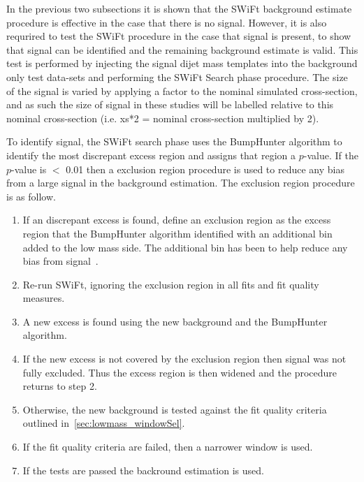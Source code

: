 In the previous two subsections it is shown that the SWiFt background estimate procedure is effective in the case that there is no signal.
However, it is also requrired to test the SWiFt procedure in the case that signal is present, to show that signal can be identified and the remaining background estimate is valid.
This test is performed by injecting the signal dijet mass templates into the background only test data-sets and performing the SWiFt Search phase procedure.
The size of the signal is varied by applying a factor to the nominal simulated cross-section,
and as such the size of signal in these studies will be labelled relative to this nominal cross-section (i.e. xs*2 = nominal cross-section multiplied by 2).

To identify signal,
the SWiFt search phase uses the {\sc BumpHunter} algorithm to identify the most discrepant excess region and assigns that region a \mbox{$p$-value}.
If the \mbox{$p$-value} is $<$ 0.01 then a exclusion region procedure is used to reduce any bias from a large signal in the background estimation.
The exclusion region procedure is as follow.
\begin{enumerate}[leftmargin=*]
\item If an discrepant excess is found, define an exclusion region as the excess
  region that the {\sc BumpHunter} algorithm identified with an additional bin added to the low mass side.
  The additional bin has been to help reduce any bias from signal~\cite{dijet-mori16_paper}.
\item Re-run SWiFt, ignoring the exclusion region in all fits and fit quality measures.
\item A new excess is found using the new background and the {\sc BumpHunter} algorithm.
\item If the new excess is not covered by the exclusion region then signal was not fully excluded.
  Thus the excess region is then widened and the procedure returns to step 2.
\item Otherwise, the new background is tested against the fit quality criteria outlined in~\ref{sec:lowmass_windowSel}.
\item If the fit quality criteria are failed, then a narrower window is used.
\item If the tests are passed the backround estimation is used.
\end{enumerate}
 
